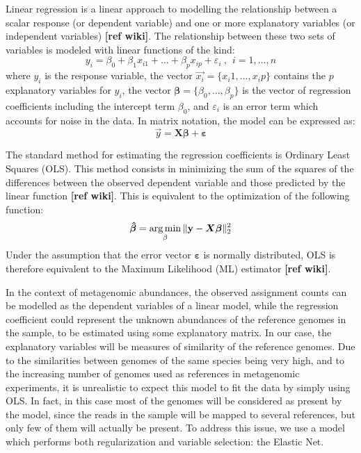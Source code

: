 Linear regression is a linear approach to modelling the relationship between a scalar response (or dependent variable) and one or more explanatory variables (or independent variables) \textbf{[ref wiki]}. The relationship between these two sets of variables is modeled with linear functions of the kind:
\begin{equation*}
    y_i = \beta_0 + \beta_1 x_{i1} + \dots + \beta_p x_{ip} + \varepsilon_i ~,~~ i = 1, \dots , n
\end{equation*}
where $y_i$ is the response variable, the vector $\vec{x_i} = \{x_i1, \dots, x_ip \}$ contains the $p$ explanatory variables for $y_i$, the vector $\boldsymbol{\beta} = \{\beta_0, \dots, \beta_p \}$ is the vector of regression coefficients including the intercept term $\beta_0$, and $\varepsilon_i$ is an error term which accounts for noise in the data. In matrix notation, the model can be expressed as:
\begin{equation*}
    \vec{y} = \boldsymbol{X}\boldsymbol{\beta} + \boldsymbol{\varepsilon}
\end{equation*}

The standard method for estimating the regression coefficients is Ordinary Least Squares (OLS). This method consists in minimizing the sum of the squares of the differences between the observed dependent variable and those predicted by the linear function \textbf{[ref wiki]}. This is equivalent to the optimization of the following function:
\begin{equation*}
    \boldsymbol{\hat{\beta}} = \operatorname*{arg\,min}_{\beta}{\lVert\mathbf{y} - \boldsymbol{X}\boldsymbol{\beta}\rVert_2^2}
\end{equation*}
Under the assumption that the error vector $\boldsymbol{\varepsilon}$ is normally distributed, OLS is therefore equivalent to the Maximum Likelihood (ML) estimator \textbf{[ref wiki]}.

In the context of metagenomic abundances, the observed assignment counts can be modelled as the dependent variables of a linear model, while the regression coefficient could represent the unknown abundances of the reference genomes in the sample, to be estimated using some explanatory matrix. In our case, the explanatory variables will be measures of similarity of the reference genomes. Due to the similarities between genomes of the same species being very high, and to the increasing number of genomes used as references in metagenomic experiments, it is unrealistic to expect this model to fit the data by simply using OLS. In fact, in this case most of the genomes will be considered as present by the model, since the reads in the sample will be mapped to several references, but only few of them will actually be present. To address this issue, we use a model which performs both regularization and variable selection: the Elastic Net.

